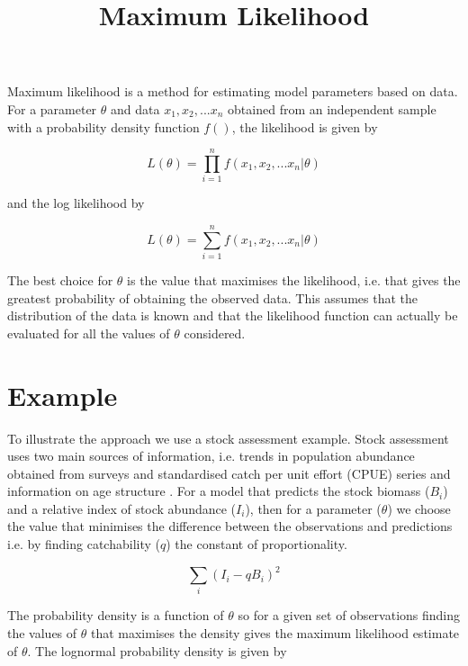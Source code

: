 \documentclass[a4paper,10pt]{article}
\title{Maximum Likelihood}
\author{}
\date{}
\begin{document}
\maketitle

Maximum likelihood is a method for estimating model parameters based on data. For a parameter $\theta$ and data $x_1,x_2,...x_n$ obtained from an independent sample with a probability density function $f()$, the likelihood is given by

\begin{equation}\label{eq1}
L(\theta)=\prod_{i=1}^{n} f(x_1,x_2,...x_n|\theta)
\end{equation}

and the log likelihood by

\begin{equation}\label{eq2}
L(\theta)=\sum_{i=1}^{n} f(x_1,x_2,...x_n|\theta)
\end{equation}

The best choice for $\theta$ is the value that maximises the likelihood, i.e. that gives the greatest probability of obtaining the observed data. This assumes that the distribution of the data is known and that the likelihood function can actually be evaluated for all the values of $\theta$ considered.

\section*{Example}

To illustrate the approach we use a stock assessment example. Stock assessment uses two main sources of information, i.e. trends in population abundance obtained from surveys and standardised catch per unit effort (CPUE) series and information on age structure \cite{punt1997fisherie}. For a model that predicts the stock biomass ($B_{i}$) and a relative index of stock abundance ($I_{i}$), then for a parameter ($\theta$) we choose the value that minimises the difference between the observations and predictions i.e. by finding catchability ($q$) the constant of proportionality.

\begin{equation}\label{eq4}
\sum_i \left({I_{i}-qB_{i}} \right)^2 
\end{equation}

The probability density is a function of $\theta$ so for a given set of observations finding the values of $\theta$ that maximises the density gives the maximum likelihood estimate of $\theta$. The lognormal probability density is given by
\end{document}

